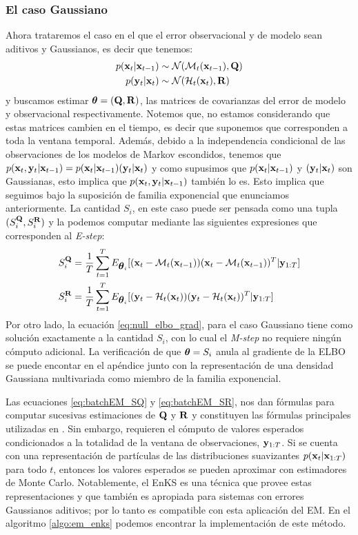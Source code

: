 \subsubsection*{El caso Gaussiano}
Ahora trataremos el caso en el que el error observacional y de modelo sean aditivos y Gaussianos, es decir que tenemos:
\begin{align}
    p(\mathbf{x}_t | \mathbf{x}_{t-1}) &\sim \mathcal{N}(\mathcal{M}_t(\mathbf{x}_{t-1}), \mathbf{Q}) \\
    p(\mathbf{y}_t | \mathbf{x}_t) &\sim \mathcal{N}(\mathcal{H}_t(\mathbf{x}_t), \mathbf{R})
\end{align}
y buscamos estimar $\mbox{\boldmath$ \theta $} = (\mathbf{Q}, \mathbf{R})$, las matrices de covarianzas del error de modelo y observacional respectivamente. Notemos que, no estamos considerando que estas matrices cambien en el tiempo, es decir que suponemos que corresponden a toda la ventana temporal. Además, debido a la independencia condicional de las observaciones de los modelos de Markov escondidos, tenemos que $p(\mathbf{x}_t, \mathbf{y}_t | \mathbf{x}_{t-1}) = p(\mathbf{x}_t | \mathbf{x}_{t-1}) (\mathbf{y}_t | \mathbf{x}_t)$ y como supusimos que $p(\mathbf{x}_t | \mathbf{x}_{t-1})$ y $(\mathbf{y}_t | \mathbf{x}_t)$ son Gaussianas, esto implica que $p(\mathbf{x}_t, \mathbf{y}_t | \mathbf{x}_{t-1})$ también lo es. Esto implica que seguimos bajo la suposición de familia exponencial que enunciamos anteriormente. La cantidad $S_i$, en este caso puede ser pensada como una tupla $(S_i^{\mathbf{Q}}, S_i^{\mathbf{R}})$ y la podemos computar mediante las siguientes expresiones que corresponden al \textit{E-step}:
\begin{align}
    S_i^{\mathbf{Q}} &= \frac{1}{T}\sum_{t=1}^T E_{\mbox{\boldmath$ \theta $}_i}[(\mathbf{x}_t - \mathcal{M}_t(\mathbf{x}_{t-1}))(\mathbf{x}_t - \mathcal{M}_t(\mathbf{x}_{t-1}))^T | \mathbf{y}_{1:T}] \label{eq:batchEM_SQ} \\
    S_i^{\mathbf{R}} &= \frac{1}{T}\sum_{t=1}^T E_{\mbox{\boldmath$ \theta $}_i}[(\mathbf{y}_t - \mathcal{H}_t(\mathbf{x}_t))(\mathbf{y}_t - \mathcal{H}_t(\mathbf{x}_t))^T | \mathbf{y}_{1:T}] \label{eq:batchEM_SR}
\end{align}
Por otro lado, la ecuación \ref{eq:null_elbo_grad}, para el caso Gaussiano tiene como solución exactamente a la cantidad $S_i$, con lo cual el \textit{M-step} no requiere ningún cómputo adicional. La verificación de que $\mbox{\boldmath$ \theta $} = S_i$ anula al gradiente de la ELBO se puede encontar en el apéndice junto con la representación de una densidad Gaussiana multivariada como miembro de la familia exponencial.

Las ecuaciones \ref{eq:batchEM_SQ} y \ref{eq:batchEM_SR}, nos dan fórmulas para computar sucesivas estimaciones de $\mathbf{Q}$ y $\mathbf{R}$ y constituyen las fórmulas principales utilizadas en \cite{Dreano2017, Tandeo2015, Pulido2019}. Sin embargo, requieren el cómputo de valores esperados condicionados a la totalidad de la ventana de observaciones, $\mathbf{y}_{1:T}$. Si se cuenta con una representación de partículas de las distribuciones suavizantes $p(\mathbf{x}_t | \mathbf{x}_{1:T})$ para todo $t$, entonces los valores esperados se pueden aproximar con estimadores de Monte Carlo. Notablemente, el EnKS es una técnica que provee estas representaciones y que también es apropiada para sistemas con errores Gaussianos aditivos; por lo tanto es compatible con esta aplicación del EM. En el algoritmo \ref{algo:em_enks} podemos encontrar la implementación de este método.

